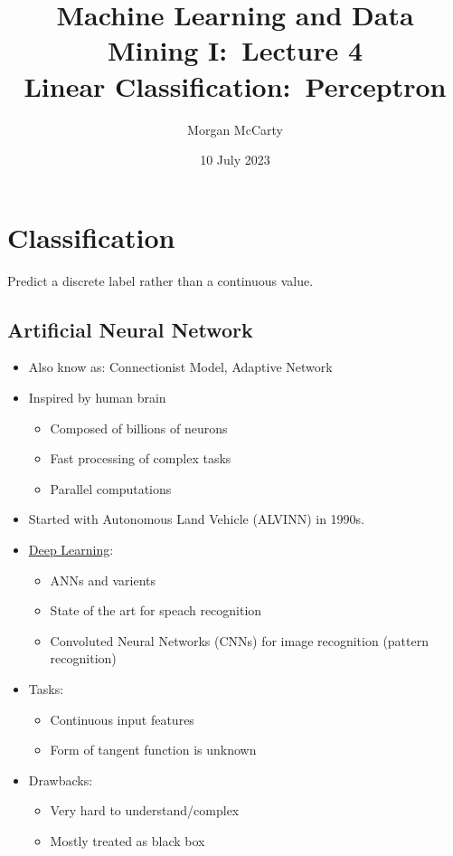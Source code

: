 \documentclass[12pt]{article}
\title{
    Machine Learning and Data Mining I:\ Lecture 4\\
    Linear Classification:\ Perceptron}
\author{Morgan McCarty}
\date{10 July 2023}
\begin{document}
    \maketitle

    \section{Classification}
        Predict a discrete label rather than a continuous value.
        \subsection{Artificial Neural Network}
            \begin{itemize}
                \item Also know as: Connectionist Model, Adaptive Network
                \item Inspired by human brain
                \begin{itemize}
                    \item Composed of billions of neurons
                    \item Fast processing of complex tasks
                    \item Parallel computations
                \end{itemize}
                \item Started with Autonomous Land Vehicle (ALVINN) in 1990s.
                \item \underline{Deep Learning}:
                \begin{itemize}
                    \item ANNs and varients
                    \item State of the art for speach recognition
                    \item Convoluted Neural Networks (CNNs) for image recognition (pattern recognition)
                \end{itemize}
                \item Tasks:
                \begin{itemize}
                    \item Continuous input features
                    \item Form of tangent function is unknown
                \end{itemize}
                \item Drawbacks:
                \begin{itemize}
                    \item Very hard to understand/complex
                    \item Mostly treated as black box
                \end{itemize}
            \end{itemize}
\end{document}
